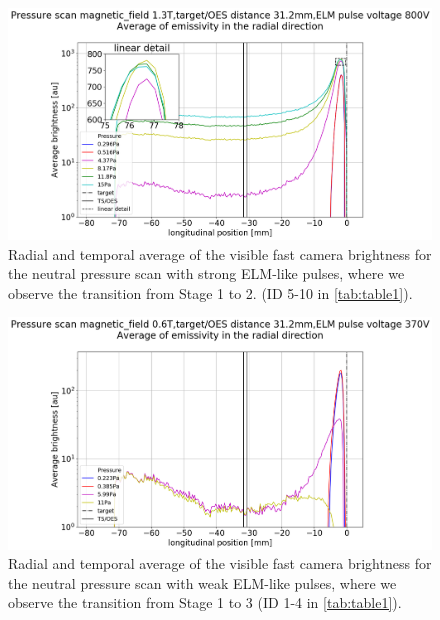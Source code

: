 \begin{figure}[!ht]
	\centering
	\includegraphics[width=0.7\linewidth,trim={110 0 170 85},clip]{Chapters/chapter3/figs/20.png}
	\caption{Radial and temporal average of the visible fast camera brightness for the neutral pressure scan with strong ELM-like pulses, where we observe the transition from Stage 1 to 2. (ID 5-10 in \autoref{tab:table1}).}
	\label{fig:ELM2}
\end{figure}

\begin{figure}[!ht]
	\centering
	\includegraphics[width=0.7\linewidth,trim={110 0 170 85},clip]{Chapters/chapter3/figs/39.png}
	\caption{Radial and temporal average of the visible fast camera brightness for the neutral pressure scan with weak ELM-like pulses, where we observe the transition from Stage 1 to 3 (ID 1-4 in \autoref{tab:table1}).}
	\label{fig:ELM3}
\end{figure}


